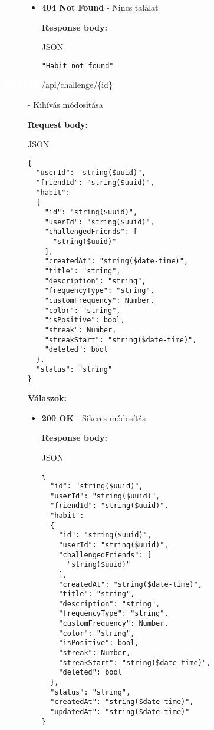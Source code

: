 \documentclass[12pt]{report}
\newcommand{\httpPatch}[1]{\colorbox{patchColor}{\textbf{\textcolor{white}{PATCH}}}~#1}
\begin{document}
\begin{description}
\begin{itemize}
      \item \textbf{404 Not Found} - Nincs találat

        \textbf{Response body:}
        \begin{codeblock}{JSON}
          \begin{verbatim}
"Habit not found"
          \end{verbatim}
        \end{codeblock}
    \end{itemize}

  \item[\httpPatch{/api/challenge/\{id\}}] - Kihívás módosítása

    \vspace{0.5cm}
    \textbf{Request body:}
    \begin{codeblock}{JSON}
      \begin{verbatim}
{
  "userId": "string($uuid)",
  "friendId": "string($uuid)",
  "habit": 
  {
    "id": "string($uuid)",
    "userId": "string($uuid)",
    "challengedFriends": [
      "string($uuid)"
    ],
    "createdAt": "string($date-time)",
    "title": "string",
    "description": "string",
    "frequencyType": "string",
    "customFrequency": Number,
    "color": "string",
    "isPositive": bool,
    "streak": Number,
    "streakStart": "string($date-time)",
    "deleted": bool
  },
  "status": "string"
}
      \end{verbatim}
    \end{codeblock}

    \vspace{0.5cm}
    \textbf{Válaszok:}
    \begin{itemize}
      \item \textbf{200 OK} - Sikeres módosítás

        \textbf{Response body:}
        \begin{codeblock}{JSON}
          \begin{verbatim}
{
  "id": "string($uuid)",
  "userId": "string($uuid)",
  "friendId": "string($uuid)",
  "habit": 
  {
    "id": "string($uuid)",
    "userId": "string($uuid)",
    "challengedFriends": [
      "string($uuid)"
    ],
    "createdAt": "string($date-time)",
    "title": "string",
    "description": "string",
    "frequencyType": "string",
    "customFrequency": Number,
    "color": "string",
    "isPositive": bool,
    "streak": Number,
    "streakStart": "string($date-time)",
    "deleted": bool
  },
  "status": "string",
  "createdAt": "string($date-time)",
  "updatedAt": "string($date-time)"
}
          \end{verbatim}
        \end{codeblock}


\end{itemize}
\end{description}
\end{document}
